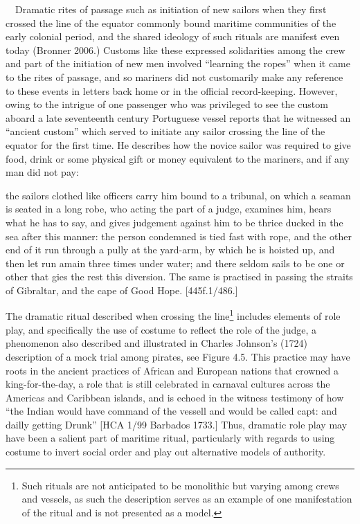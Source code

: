 \begin{styleStandard}
\ \ Dramatic rites of passage such as initiation of new sailors when they first crossed the line of the equator commonly bound maritime communities of the early colonial period, and the shared ideology of such rituals are manifest even today (Bronner 2006.) Customs like these expressed solidarities among the crew and part of the initiation of new men involved “learning the ropes” when it came to the rites of passage, and so mariners did not customarily make any reference to these events in letters back home or in the official record-keeping. However, owing to the intrigue of one passenger who was privileged to see the custom aboard a late seventeenth century Portuguese vessel reports that he witnessed an “ancient custom” which served to initiate any sailor crossing the line of the equator for the first time. He describes how the novice sailor was required to give food, drink or some physical gift or money equivalent to the mariners, and if any man did not pay: 
\end{styleStandard}

\begin{styleStandard}
the sailors clothed like officers carry him bound to a tribunal, on which a seaman is seated in a long robe, who acting the part of a judge, examines him, hears what he has to say, and gives judgement against him to be thrice ducked in the sea after this manner: the person condemned is tied fast with rope, and the other end of it run through a pully at the yard-arm, by which he is hoisted up, and then let run amain three times under water; and there seldom sails to be one or other that gies the rest this diversion. The same is practised in passing the straits of Gibraltar, and the cape of Good Hope. [445f.1/486.] 
\end{styleStandard}

\begin{styleStandard}
The dramatic ritual described when crossing the line\footnote{ Such rituals are not anticipated to be monolithic but varying among crews and vessels, as such the description serves as an example of one manifestation of the ritual and is not presented as a model. } includes elements of role play, and specifically the use of costume to reflect the role of the judge, a phenomenon also described and illustrated in Charles Johnson’s (1724) description of a mock trial among pirates, see Figure 4.5. This practice may have roots in the ancient practices of African and European nations that crowned a king-for-the-day, a role that is still celebrated in carnaval cultures across the Americas and Caribbean islands, and is echoed in the witness testimony of how “the Indian would have command of the vessell and would be called capt: and dailly getting Drunk” [HCA 1/99 Barbados 1733.] Thus, dramatic role play may have been a salient part of maritime ritual, particularly with regards to using costume to invert social order and play out alternative models of authority. 
\end{styleStandard}

